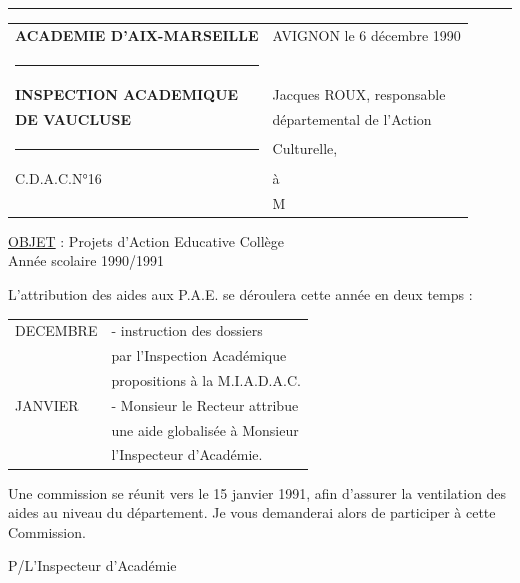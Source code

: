 \hrule
\begin{tabular}{p{.47\linewidth}p{.47\linewidth}}
\textbf{ACADEMIE D'AIX-MARSEILLE} & AVIGNON le 6 décembre 1990\\
\rule{3cm}{.4pt}&\\
\textbf{INSPECTION ACADEMIQUE} & Jacques ROUX, responsable\\
\textbf{DE VAUCLUSE}&départemental de l'Action\\
\rule{1cm}{.4pt}&Culturelle,\\[1em]
C.D.A.C.N°16&à\\[1em]
&M
\end{tabular}

\uline{OBJET} : Projets d'Action Educative Collège\\
Année scolaire 1990/1991

L'attribution des aides aux P.A.E. se déroulera cette année en deux temps :

\begin{tabular}{l p{.72\linewidth}}
DECEMBRE & - instruction des dossiers\\
&par l'Inspection Académique\\[1em]
&propositions à la M.I.A.D.A.C.\\[1em]
JANVIER & - Monsieur le Recteur attribue\\
&une aide globalisée à Monsieur\\
&l'Inspecteur d'Académie.
\end{tabular}

Une commission se réunit vers le 15 janvier 1991, afin d'assurer la ventilation des aides au niveau du département. Je vous demanderai alors de participer à cette Commission.

P/L'Inspecteur d'Académie


\deleted{\[p_0p_{12}=p_0p_{13}=p_0\underbrace{p_{12}\rho^2}_{p_{31}}\sigma_2\]}
\deleted{\[\rho^2\sigma_2=\sigma_3\rho^2\]}
\deleted{\[p_0p_{12}\sigma_1=p_0p_{12}\]}
\deleted{\[(x,x,y)\]}
\deleted{\[\delta_1\sigma=(x,y,y)\qquad z,x,y\]}
\deleted{\[(x,x,y)\qquad(y,y,x)\]}
\deleted{\[(x,y,z)\mapsto(z,x,y)\qquad(x,z,y)=\sigma_1\]}

